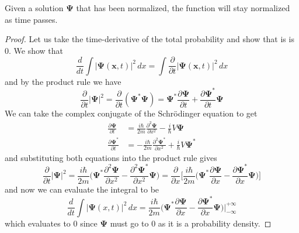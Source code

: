 \documentclass{article}
\begin{document}
    \begin{theorem} 
      Given a solution $\boldsymbol{\Psi}$ that has been normalized, the function will stay normalized as time passes. 
    \end{theorem}
    \begin{proof} 
      Let us take the time-derivative of the total probability and show that is is $0$. We show that 
      \begin{equation} 
        \frac{d}{dt}  \int |\boldsymbol{\Psi} (\mathbf{x}, t)|^2 \,dx = \int \frac{\partial}{\partial t} |\boldsymbol{\Psi}(\mathbf{x}, t)|^2 \,dx
      \end{equation}
      and by the product rule we have 
      \begin{equation} 
        \frac{\partial}{\partial t} |\boldsymbol{\Psi}|^2 = \frac{\partial}{\partial t} (\boldsymbol{\Psi}^\ast \boldsymbol{\Psi}) = \boldsymbol{\Psi}^\ast \frac{\partial \boldsymbol{\Psi}}{\partial t} + \frac{\partial \boldsymbol{\Psi}^\ast}{\partial t} \boldsymbol{\Psi}
      \end{equation}
      We can take the complex conjugate of the Schr\"odinger equation to get 
      \begin{align} 
        \frac{\partial \boldsymbol{\Psi}}{\partial t} & = \frac{i \hbar}{2m} \frac{\partial^2 \boldsymbol{\Psi}}{\partial x^2} - \frac{i}{\hbar} V \boldsymbol{\Psi} \\
        \frac{\partial \boldsymbol{\Psi}^\ast}{\partial t} & = - \frac{i \hbar}{2m} \frac{\partial^2 \boldsymbol{\Psi}^\ast}{\partial x^2} + \frac{i}{\hbar} V \boldsymbol{\Psi}^\ast 
      \end{align}
      and substituting both equations into the product rule gives 
      \begin{equation} 
        \frac{\partial}{\partial t} |\boldsymbol{\Psi}|^2 = \frac{i \hbar}{2m} \bigg( \boldsymbol{\Psi}^\ast \frac{\partial^2 \boldsymbol{\Psi}}{\partial x^2} - \frac{\partial^2 \boldsymbol{\Psi}^\ast}{\partial x^2} \boldsymbol{\Psi} \bigg) = \frac{\partial}{\partial x} \bigg[ \frac{i \hbar}{2m} \bigg( \boldsymbol{\Psi}^\ast \frac{\partial \boldsymbol{\Psi}}{\partial x} - \frac{\partial \boldsymbol{\Psi}^\ast}{\partial x} \boldsymbol{\Psi} \bigg)\bigg]
      \end{equation}
      and now we can evaluate the integral to be 
      \begin{equation} 
        \frac{d}{dt} \int |\boldsymbol{\Psi}(x, t)|^2 \,dx = \frac{i \hbar}{2m} \big( \boldsymbol{\Psi}^\ast \frac{\partial \boldsymbol{\Psi}}{\partial x} - \frac{\partial \boldsymbol{\Psi}^\ast}{\partial x} \boldsymbol{\Psi} \bigg) \bigg|_{-\infty}^{+\infty} 
      \end{equation}
      which evaluates to $0$ since $\boldsymbol{\Psi}$ must go to $0$ as it is a probability density. 
    \end{proof}
\end{document}
